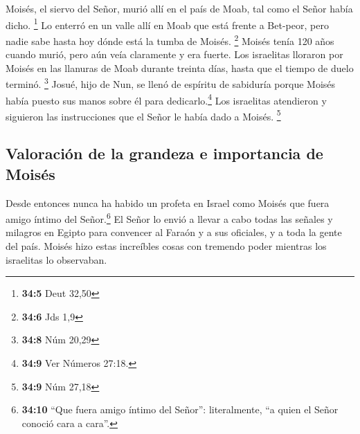  Moisés, el siervo del Señor, murió allí en el país de
Moab, tal como el Señor había dicho. \footnote{\textbf{34:5} Deut 32,50}
 Lo enterró en un valle allí en Moab que está frente a
Bet-peor, pero nadie sabe hasta hoy dónde está la tumba de Moisés.
\footnote{\textbf{34:6} Jds 1,9}  Moisés tenía 120 años
cuando murió, pero aún veía claramente y era fuerte.  Los
israelitas lloraron por Moisés en las llanuras de Moab durante treinta
días, hasta que el tiempo de duelo terminó. \footnote{\textbf{34:8} Núm
  20,29}  Josué, hijo de Nun, se llenó de espíritu de
sabiduría porque Moisés había puesto sus manos sobre él para
dedicarlo.\footnote{\textbf{34:9} Ver Números 27:18.} Los israelitas
atendieron y siguieron las instrucciones que el Señor le había dado a
Moisés. \footnote{\textbf{34:9} Núm 27,18}

\hypertarget{valoraciuxf3n-de-la-grandeza-e-importancia-de-moisuxe9s}{%
\subsection{Valoración de la grandeza e importancia de
Moisés}\label{valoraciuxf3n-de-la-grandeza-e-importancia-de-moisuxe9s}}

 Desde entonces nunca ha habido un profeta en Israel como
Moisés que fuera amigo íntimo del Señor.\footnote{\textbf{34:10} ``Que
  fuera amigo íntimo del Señor'': literalmente, ``a quien el Señor
  conoció cara a cara''.}  El Señor lo envió a llevar a
cabo todas las señales y milagros en Egipto para convencer al Faraón y a
sus oficiales, y a toda la gente del país.  Moisés hizo
estas increíbles cosas con tremendo poder mientras los israelitas lo
observaban.
